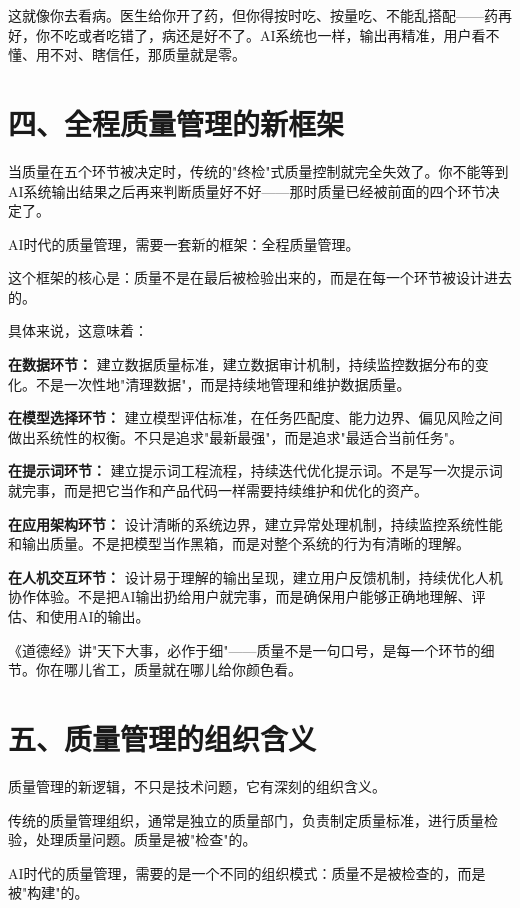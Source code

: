 这就像你去看病。医生给你开了药，但你得按时吃、按量吃、不能乱搭配——药再好，你不吃或者吃错了，病还是好不了。AI系统也一样，输出再精准，用户看不懂、用不对、瞎信任，那质量就是零。

\section{四、全程质量管理的新框架}


当质量在五个环节被决定时，传统的"终检"式质量控制就完全失效了。你不能等到AI系统输出结果之后再来判断质量好不好——那时质量已经被前面的四个环节决定了。

AI时代的质量管理，需要一套新的框架：全程质量管理。

这个框架的核心是：质量不是在最后被检验出来的，而是在每一个环节被设计进去的。

具体来说，这意味着：

\textbf{在数据环节：} 建立数据质量标准，建立数据审计机制，持续监控数据分布的变化。不是一次性地"清理数据"，而是持续地管理和维护数据质量。

\textbf{在模型选择环节：} 建立模型评估标准，在任务匹配度、能力边界、偏见风险之间做出系统性的权衡。不只是追求"最新最强"，而是追求"最适合当前任务"。

\textbf{在提示词环节：} 建立提示词工程流程，持续迭代优化提示词。不是写一次提示词就完事，而是把它当作和产品代码一样需要持续维护和优化的资产。

\textbf{在应用架构环节：} 设计清晰的系统边界，建立异常处理机制，持续监控系统性能和输出质量。不是把模型当作黑箱，而是对整个系统的行为有清晰的理解。

\textbf{在人机交互环节：} 设计易于理解的输出呈现，建立用户反馈机制，持续优化人机协作体验。不是把AI输出扔给用户就完事，而是确保用户能够正确地理解、评估、和使用AI的输出。

《道德经》讲"天下大事，必作于细"——质量不是一句口号，是每一个环节的细节。你在哪儿省工，质量就在哪儿给你颜色看。

\section{五、质量管理的组织含义}


质量管理的新逻辑，不只是技术问题，它有深刻的组织含义。

传统的质量管理组织，通常是独立的质量部门，负责制定质量标准，进行质量检验，处理质量问题。质量是被"检查"的。

AI时代的质量管理，需要的是一个不同的组织模式：质量不是被检查的，而是被"构建"的。

